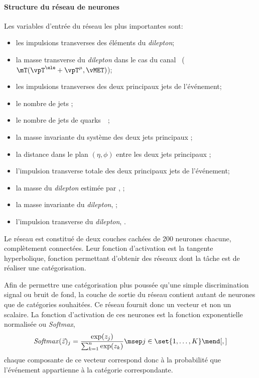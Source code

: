 \paragraph{Structure du réseau de neurones}
Les variables d'entrée du réseau les plus importantes sont:
\begin{itemize}
\item les impulsions transverses des éléments du \emph{dilepton};
\item la masse transverse du \emph{dilepton} dans le cas du canal \ele\mu\ ($\mT(\vpT^{\ele}+\vpT^{\mu},\vMET)$);
\item les impulsions transverses des deux principaux jets de l'événement;
\item le nombre de jets \Njets;
\item le nombre de jets de quarks~\quarkb\ \Nbjets;
\item la masse invariante du système des deux jets principaux \mjj;
\item la distance dans le plan $(\eta,\phi)$ entre les deux jets principaux \Detajj;
\item l'impulsion transverse totale des deux principaux jets de l'événement;
\item la masse du \emph{dilepton} estimée par \SVFIT, \msv;
\item la masse invariante du \emph{dilepton}, \mvis;
\item l'impulsion transverse du \emph{dilepton}, \pTvis.
\end{itemize}
Le réseau est constitué de deux couches cachées de 200 neurones chacune, complètement connectées.
Leur fonction d'activation est la tangente hyperbolique, fonction permettant d'obtenir des réseaux dont la tâche est de réaliser une catégorisation.
\par
Afin de permettre une catégorisation plus poussée qu'une simple discrimination signal ou bruit de fond, la couche de sortie du réseau contient autant de neurones que de catégories souhaitées.
Ce réseau fournit donc un vecteur et non un scalaire.
La fonction d'activation de ces neurones est la fonction exponentielle normalisée ou \emph{Softmax},
\begin{equation}
\mathit{Softmax}(\vec{z})_j = \frac{\exp(z_j)}{\sum_{k=1}^n \exp(z_k)}
\msep
j\in\set{1,\ldots,K}
\mend[,]
\end{equation}
chaque composante de ce vecteur correspond donc à la probabilité que l'événement appartienne à la catégorie correspondante.
